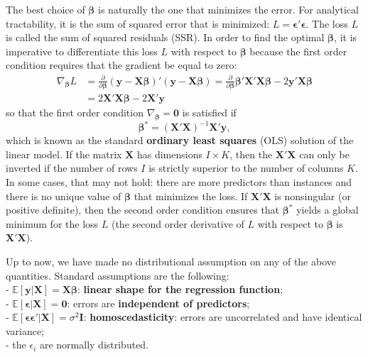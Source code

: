 \documentclass[]{krantz}
\theoremstyle{definition}
\theoremstyle{definition}
\theoremstyle{definition}
\theoremstyle{remark}
\begin{document}
The best choice of \(\boldsymbol{\beta}\) is naturally the one that
minimizes the error. For analytical tractability, it is the sum of
squared error that is minimized:
\(L=\boldsymbol{\epsilon}'\boldsymbol{\epsilon}\). The loss \(L\) is
called the sum of squared residuals (SSR). In order to find the optimal
\(\boldsymbol{\beta}\), it is imperative to differentiate this loss
\(L\) with respect to \(\boldsymbol{\beta}\) because the first order
condition requires that the gradient be equal to zero: \begin{align*}
\nabla_{\boldsymbol{\beta}} L&=\frac{\partial}{\partial \boldsymbol{\beta}}(\textbf{y}-\textbf{X}\boldsymbol{\beta})'(\textbf{y}-\textbf{X}\boldsymbol{\beta})=\frac{\partial}{\partial \boldsymbol{\beta}}\boldsymbol{\beta}'\textbf{X}'\textbf{X}\boldsymbol{\beta}-2\textbf{y}'\textbf{X}\boldsymbol{\beta} \\
&=2\textbf{X}'\textbf{X}\boldsymbol{\beta}  -2\textbf{X}'\textbf{y}
\end{align*} so that the first order condition
\(\nabla_{\boldsymbol{\beta}}=\textbf{0}\) is satisfied if
\begin{equation}
\label{eq:regbeta}
\boldsymbol{\beta}^*=(\textbf{X}'\textbf{X})^{-1}\textbf{X}'\textbf{y},
\end{equation} which is known as the standard \textbf{ordinary least
squares} (OLS) solution of the linear model. If the matrix
\(\textbf{X}\) has dimensions \(I \times K\), then the
\(\textbf{X}'\textbf{X}\) can only be inverted if the number of rows
\(I\) is strictly superior to the number of columns \(K\). In some
cases, that may not hold: there are more predictors than instances and
there is no unique value of \(\boldsymbol{\beta}\) that minimizes the
loss. If \(\textbf{X}'\textbf{X}\) is nonsingular (or positive
definite), then the second order condition ensures that
\(\boldsymbol{\beta}^*\) yields a global minimum for the loss \(L\) (the
second order derivative of \(L\) with respect to \(\boldsymbol{\beta}\)
is \(\textbf{X}'\textbf{X}\)).

Up to now, we have made no distributional assumption on any of the above
quantities. Standard assumptions are the following:\\
- \(\mathbb{E}[\textbf{y}|\textbf{X}]=\textbf{X}\boldsymbol{\beta}\):
\textbf{linear shape for the regression function};\\
- \(\mathbb{E}[\boldsymbol{\epsilon}|\textbf{X}]=\textbf{0}\): errors
are \textbf{independent of predictors};\\
-
\(\mathbb{E}[\boldsymbol{\epsilon}\boldsymbol{\epsilon}'| \textbf{X}]=\sigma^2\textbf{I}\):
\textbf{homoscedasticity}: errors are uncorrelated and have identical
variance;\\
- the \(\epsilon_i\) are normally distributed.
\end{document}
